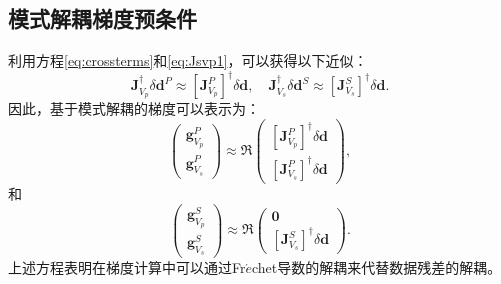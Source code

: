 \subsection{模式解耦梯度预条件}
利用方程\eqref{eq:crossterms}和\eqref{eq:Jsvp1}，可以获得以下近似：
\begin{equation}
        \mathbf{J}^{\dagger}_{V_p}\delta \mathbf{d}^P\approx
        [\mathbf{J}^P_{V_p}]^{\dagger}\delta \mathbf{d},\quad
        \mathbf{J}^{\dagger}_{V_s}\delta \mathbf{d}^S\approx
        [\mathbf{J}^S_{V_s}]^{\dagger}\delta \mathbf{d}.
        \label{eq:crossterm}
\end{equation}
因此，基于模式解耦的梯度可以表示为：
\begin{equation}
        \begin{pmatrix}
                \mathbf{g}^P_{V_p}\\
                \mathbf{g}^P_{V_s}
        \end{pmatrix}
        \approx\mathfrak{R}\begin{pmatrix}
                [\mathbf{J}_{V_p}^{P}]^{\dagger}\delta \mathbf{d}\\
                [\mathbf{J}_{V_s}^{P}]^{\dagger}\delta \mathbf{d}
        \end{pmatrix},
        \label{eq:MatrixGraP}
\end{equation}
和
\begin{equation}
        \begin{pmatrix}
                \mathbf{g}^S_{V_p}\\ 
                \mathbf{g}^S_{V_s}
        \end{pmatrix}
        \approx\mathfrak{R}\begin{pmatrix}
                \mathbf{0}\\ 
                [\mathbf{J}^S_{V_s}]^{\dagger}\delta \mathbf{d}
        \end{pmatrix}.
        \label{eq:MatrixGraS}
\end{equation}
上述方程表明在梯度计算中可以通过Fr{$\acute{e}$}chet导数的解耦来代替数据残差的解耦。

